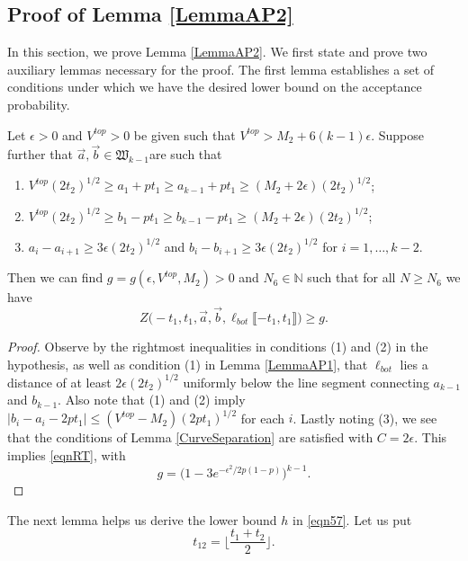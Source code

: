 \subsection{Proof of Lemma \ref{LemmaAP2}} \label{sect62} In this section, we prove Lemma \ref{LemmaAP2}. We first state and prove two auxiliary lemmas necessary for the proof. The first lemma establishes a set of conditions under which we have the desired lower bound on the acceptance probability. 

\begin{lemma}\label{LemmaBP1} Let $\epsilon > 0$ and $V^{top} > 0$ be given such that $V^{top} > M_2 + 6 (k-1) \epsilon$. Suppose further that $\vec{a}, \vec{b} \in \mathfrak{W}_{k-1}$are such that 
	\begin{enumerate}
		\item $V^{top} (2t_2)^{1/2} \geq a_1 + p t_1 \geq a_{k-1} + pt_1 \geq (M_2 + 2 \epsilon) (2t_2)^{1/2}$;
		\item $V^{top} (2t_2)^{1/2} \geq b_1 - p t_1 \geq b_{k-1} - pt_1 \geq (M_2 + 2 \epsilon) (2t_2)^{1/2}$; 
		\item $a_i -a_{i+1} \geq 3\epsilon (2t_2)^{1/2}$ and $b_{i} - b_{i+1} \geq 3 \epsilon (2t_2)^{1/2}$ for $i = 1, \dots, k-2$.
	\end{enumerate}
	Then we can find $g = g(\epsilon, V^{top}, M_2) > 0$ and $N_6 \in \mathbb{N}$ such that for all $N \geq N_6$ we have 
	\begin{equation}\label{eqnRT}
	Z\big(  -t_1, t_1, \vec{a} ,\vec{b}, \ell_{bot}\llbracket -t_1, t_1\rrbracket\big) \geq g.
	\end{equation}
\end{lemma}

\begin{proof}
	
	Observe by the rightmost inequalities in conditions (1) and (2) in the hypothesis, as well as condition (1) in Lemma \ref{LemmaAP1}, that $\ell_{bot}$ lies a distance of at least $2\epsilon(2t_2)^{1/2}$ uniformly below the line segment connecting $a_{k-1}$ and $b_{k-1}$. Also note that (1) and (2) imply $|b_i-a_i-2pt_1| \leq (V^{top} - M_2)(2pt_1)^{1/2}$ for each $i$. Lastly noting (3), we see that the conditions of Lemma \ref{CurveSeparation} are satisfied with $C = 2\epsilon$. This implies \eqref{eqnRT}, with
	\[
	g = \big(1 - 3e^{-\epsilon^2/2p(1-p)}\big)^{k-1}.
	\]
	
\end{proof}

The next lemma helps us derive the lower bound $h$ in \eqref{eqn57}. Let us put 
\begin{equation}\label{t12def}
t_{12} = \Big\lfloor \frac{t_1 + t_2}{2} \Big\rfloor.
\end{equation}

